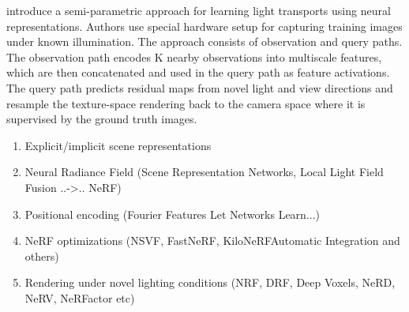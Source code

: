 \cite{Zhang2021lighttransport} introduce a semi-parametric approach
for learning light transports using neural representations.
Authors use special hardware setup for capturing training images under known illumination.
The approach consists of observation and query paths.
The observation path encodes K nearby observations into multiscale features,
which are then concatenated and used in the query path as feature activations.
The query path predicts residual maps from novel light and view directions
and resample the texture-space rendering back to the camera space
where it is supervised by the ground truth images.




{\color{teal}
\begin{enumerate}
    \item Explicit/implicit scene representations
    \item Neural Radiance Field (Scene Representation Networks, Local Light Field Fusion ..->.. NeRF)
    \item Positional encoding (Fourier Features Let Networks Learn...) %
    \item NeRF optimizations (NSVF, FastNeRF, KiloNeRFAutomatic Integration and others)
    \item Rendering under novel lighting conditions (NRF, DRF, Deep Voxels, NeRD, NeRV, NeRFactor etc)
\end{enumerate}
}


